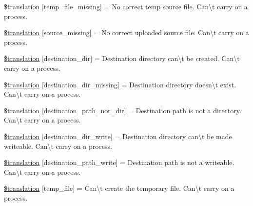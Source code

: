 \begin{DoxyCompactItemize}
\hyperlink{class_8upload_8xx___x_x_8php_ab0fa87a88aba2624004581eed0633325}{\$translation} \mbox{[}\textquotesingle{}temp\+\_\+file\+\_\+missing\textquotesingle{}\mbox{]} = \textquotesingle{}No correct temp source file. Can\textbackslash{}\textquotesingle{}t carry on a process.\textquotesingle{}
\item 
\hyperlink{class_8upload_8xx___x_x_8php_aceaaf7355acaaf10f0ae60378d03c468}{\$translation} \mbox{[}\textquotesingle{}source\+\_\+missing\textquotesingle{}\mbox{]} = \textquotesingle{}No correct uploaded source file. Can\textbackslash{}\textquotesingle{}t carry on a process.\textquotesingle{}
\item 
\hyperlink{class_8upload_8xx___x_x_8php_aff2427c72a2598aefa6d58df1dd18b08}{\$translation} \mbox{[}\textquotesingle{}destination\+\_\+dir\textquotesingle{}\mbox{]} = \textquotesingle{}Destination directory can\textbackslash{}\textquotesingle{}t be created. Can\textbackslash{}\textquotesingle{}t carry on a process.\textquotesingle{}
\item 
\hyperlink{class_8upload_8xx___x_x_8php_a9ef28d3cf09942c6c0a1e77fa09185e8}{\$translation} \mbox{[}\textquotesingle{}destination\+\_\+dir\+\_\+missing\textquotesingle{}\mbox{]} = \textquotesingle{}Destination directory doesn\textbackslash{}\textquotesingle{}t exist. Can\textbackslash{}\textquotesingle{}t carry on a process.\textquotesingle{}
\item 
\hyperlink{class_8upload_8xx___x_x_8php_a5704a67137126e8c87b7a364175929d4}{\$translation} \mbox{[}\textquotesingle{}destination\+\_\+path\+\_\+not\+\_\+dir\textquotesingle{}\mbox{]} = \textquotesingle{}Destination path is not a directory. Can\textbackslash{}\textquotesingle{}t carry on a process.\textquotesingle{}
\item 
\hyperlink{class_8upload_8xx___x_x_8php_a97608ea194a616db49141a0e6dee900c}{\$translation} \mbox{[}\textquotesingle{}destination\+\_\+dir\+\_\+write\textquotesingle{}\mbox{]} = \textquotesingle{}Destination directory can\textbackslash{}\textquotesingle{}t be made writeable. Can\textbackslash{}\textquotesingle{}t carry on a process.\textquotesingle{}
\item 
\hyperlink{class_8upload_8xx___x_x_8php_a40e4e1962226b89fd76da5819a9602b0}{\$translation} \mbox{[}\textquotesingle{}destination\+\_\+path\+\_\+write\textquotesingle{}\mbox{]} = \textquotesingle{}Destination path is not a writeable. Can\textbackslash{}\textquotesingle{}t carry on a process.\textquotesingle{}
\item 
\hyperlink{class_8upload_8xx___x_x_8php_a2baece8da11e20d45175db91851ec3e3}{\$translation} \mbox{[}\textquotesingle{}temp\+\_\+file\textquotesingle{}\mbox{]} = \textquotesingle{}Can\textbackslash{}\textquotesingle{}t create the temporary file. Can\textbackslash{}\textquotesingle{}t carry on a process.\textquotesingle{}

\end{DoxyCompactItemize}
